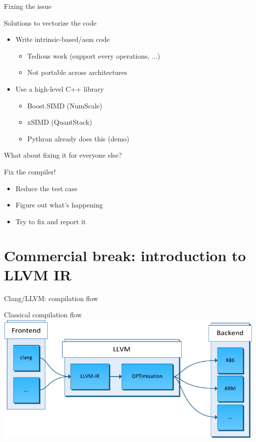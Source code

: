 \begin{frame}{Fixing the issue}
  \begin{block}{Solutions to vectorize the code}
    \begin{itemize}
      \item Write intrinsic-based/asm code
        \begin{itemize}
          \item Tedious work (support every operations, ...)
          \item Not portable across architectures
        \end{itemize}
      \pause
      \item Use a high-level C++ library
        \begin{itemize}
          \item Boost.SIMD (NumScale)
          \item xSIMD (QuantStack)
          \item Pythran already does this (demo)
        \end{itemize}
    \end{itemize}
  \end{block}

  \pause 
  \begin{center}
    What about fixing it for everyone else?
  \end{center}
  \pause

  \begin{alertblock}{Fix the compiler!}
    \begin{itemize}
      \item Reduce the test case
      \item Figure out what's happening
      \item Try to fix and report it
    \end{itemize}
  \end{alertblock}
\end{frame}

\section{Commercial break: introduction to LLVM IR}

\begin{frame}{Clang/LLVM: compilation flow}
  \begin{block}{Classical compilation flow}
    \includegraphics[width=.9\textwidth]{imgs/clang.pdf}
  \end{block}
\end{frame}

